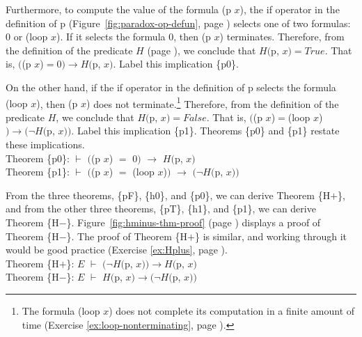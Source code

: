 Furthermore, to compute the value of the formula \textsf{(p $x$)},
the \textsf{if} operator in the definition of \textsf{p}
(Figure~\ref{fig:paradox-op-defun}, page \pageref{fig:paradox-op-defun})
selects one of two formulas:
\textsf{0} or \textsf{(loop $x$)}.
If it selects the formula \textsf{0}, then \textsf{(p $x$)} terminates.
Therefore, from the definition of the predicate $H$ (page \pageref{def:predicate-H}),
we conclude that $H($p, $x)=True$.
That is, $($\textsf{(p $x$)}$=$\textsf{0}$)\rightarrow H($\textsf{p}, $x)$.
Label this implication \{p0\}.

On the other hand, if the \textsf{if} operator in the definition of \textsf{p}
selects the formula \textsf{(loop $x$)}, then \textsf{(p $x$)}
does not terminate.\footnote{The formula \textsf{(loop $x$)} does not complete its
computation in a finite amount of time
(Exercise \ref{ex:loop-nonterminating}, page \pageref{ex:loop-nonterminating}).}
Therefore, from the definition of the predicate $H$,
we conclude that $H($\textsf{p}, $x)=False$.
That is, $($\textsf{(\textsf{p} $x$)}$=$\textsf{(loop $x$)}$)\rightarrow(\neg H($\textsf{p}, $x))$.
Label this implication \{p1\}.
Theorems \{p0\} and \{p1\} restate these implications.
\vspace{2mm}\\
\hspace*{5mm}Theorem \{p0\}: $\vdash$  $($\textsf{(p $x$)} $=$ \textsf{0}$)$ $\rightarrow$ $H($\textsf{p}, $x)$ \\
\hspace*{5mm}Theorem \{p1\}: $\vdash$  $($\textsf{(p $x$)} $=$ \textsf{(loop $x$)}$)$ $\rightarrow$ $(\neg H($\textsf{p}, $x))$
\vspace{2mm}

From the three theorems, \{pF\}, \{h0\}, and \{p0\},
we can derive Theorem \{H$+$\}, and
from the other three theorems, \{pT\}, \{h1\}, and \{p1\},
we can derive
Theorem \{H$-$\}.
Figure~\ref{fig:hminus-thm-proof} (page \pageref{fig:hminus-thm-proof}) displays
a proof of Theorem \{H$-$\}.
The proof of Theorem \{H$+$\} is similar, and working through it would be
good practice (Exercise \ref{ex:Hplus}, page \pageref{ex:Hplus}).
\vspace{2mm}\\
\hspace*{5mm}Theorem \{H$+$\}: $E$ $\vdash$ $(\neg H($\textsf{p}, $x)) \rightarrow H($\textsf{p}, $x)$ \\
\hspace*{5mm}Theorem \{H$-$\}: $E$ $\vdash$ $H($\textsf{p}, $x) \rightarrow (\neg H($\textsf{p}, $x))$
\vspace{2mm}

